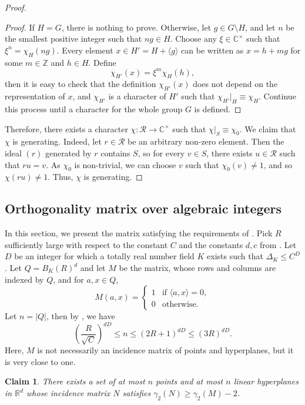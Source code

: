 \documentclass[11pt]{article}
\theoremstyle{plain}
\newtheorem{claim}[theorem]{Claim}
\theoremstyle{definition}
\begin{document}
\begin{proof}
		\begin{proof}
			If $H=G$, there is nothing to prove. Otherwise, let $g\in G\setminus H$, and let $n$ be the smallest positive integer such that $ng\in H$. Choose any $\xi\in \mathbb{C}^{\times}$ such that $\xi^n=\chi_H(ng)$.  Every element $x\in H'=H+\langle g\rangle$ can be written as $x=h+mg$ for some $m\in \mathbb{Z}$ and $h\in H$. Define
			$$\chi_{H'}(x)=\xi^m\chi_H(h),$$
			then it is easy to check that the definition $\chi_{H'}(x)$ does not depend on the representation of $x$, and  $\chi_{H'}$ is a character of $H'$ such that $\chi_{H'}|_{H}\equiv \chi_H$. Continue this process until a character for the whole group $G$ is defined.
		\end{proof}
		
		Therefore, there exists a character $\chi:\mathcal{R}\rightarrow\mathbb{C}^{\times}$ such that $\chi|_S\equiv\chi_0$. We claim that $\chi$ is generating. Indeed, let $r\in \mathcal{R}$ be an arbitrary non-zero element. Then the ideal $(r)$ generated by $r$ contains $S$, so for every $v\in S$, there exists $u\in \mathcal{R}$ such that $ru=v$. As $\chi_0$ is non-trivial, we can choose $v$ such that $\chi_0(v)\neq 1$, and so $\chi(ru)\neq 1$. Thus, $\chi$ is generating. 
	\end{proof}
	
	\subsection{Orthogonality matrix over algebraic integers}
	In this section, we present the matrix satisfying the requirements of .
	Pick $R$ sufficiently large with respect to the constant $C$ and the constants $d,c$ from . Let $D$ be an integer for which a totally real number field $K$ exists such that $\Delta_K\leq C^D$. Let $Q=B_K(R)^d$ and let $M$ be the matrix, whose rows and columns are indexed by $Q$, and for $a,x\in Q$,
	$$M(a,x)=\begin{cases}1 &\text{if }\langle a,x\rangle=0,\\
		0 &\text{otherwise}.\end{cases}$$
	Let $n=|Q|$, then by , we have
	$$\left(\frac{R}{\sqrt{C}}\right)^{dD}\leq n\leq (2R+1)^{dD}\leq (3R)^{dD}.$$
    Here, $M$ is not necessarily an incidence matrix of points and hyperplanes, but it is very close to one. 
    \begin{claim}
    There exists a set of at most $n$ points and at most $n$ linear hyperplanes in $\mathbb{R}^d$ whose incidence matrix $N$ satisfies $\gamma_2(N)\geq \gamma_2(M)-2$.
    \end{claim}
\end{document}
